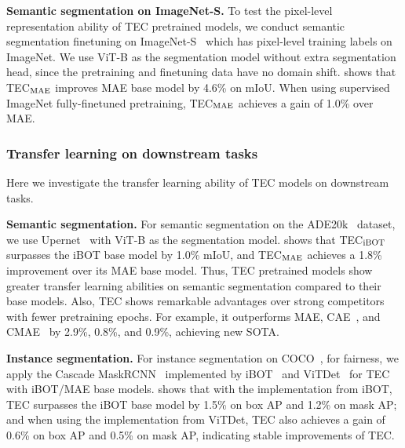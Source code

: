 \documentclass{article} \usepackage{iclr2023_conference,times}
\newcommand{\myPara}[1]{\vspace{-.05in} \noindent\textbf{#1}}
\begin{document}
\myPara{Semantic segmentation on ImageNet-S.} 
To test the pixel-level representation ability of TEC pretrained models, we conduct semantic segmentation finetuning on ImageNet-S~\citep{gao2021luss} which has  pixel-level training labels on ImageNet.
We use ViT-B as the segmentation model without   extra segmentation head, since the pretraining and finetuning data have no domain shift. 
  shows that 
 TEC$_{\rm MAE}$ improves   MAE base model by 4.6\% on  mIoU. When using  supervised ImageNet fully-finetuned pretraining, TEC$_{\rm MAE}$ achieves a gain of 1.0\% over MAE.

\vspace{-10pt}
\subsubsection{Transfer learning on downstream tasks}
\vspace{-10pt}
Here we investigate the transfer learning ability of TEC models on downstream tasks.

\myPara{Semantic segmentation.}
For semantic segmentation on the ADE20k~\citep{zhou2018semantic} dataset, we use Upernet~\citep{xiao2018unified} with  ViT-B as the segmentation model.
 shows that TEC$_{\rm iBOT}$ surpasses the iBOT base model by 1.0\%   mIoU, and
TEC$_{\rm MAE}$ achieves a 1.8\% improvement  over its MAE base model.
Thus, TEC pretrained models show greater transfer learning abilities on semantic segmentation compared to their base models.
Also, TEC shows remarkable advantages over strong competitors with fewer pretraining epochs. For example, it outperforms MAE, CAE~\citep{chen2022context}, and CMAE~\citep{huang2022contrastive} by 2.9\%, 0.8\%, and 0.9\%, achieving new SOTA.


\myPara{Instance segmentation.}
For instance segmentation on COCO~\citep{lin2014microsoft}, for fairness, we apply the Cascade MaskRCNN~\citep{cai2019cascade} implemented by iBOT~\citep{zhou2021ibot} and ViTDet~\citep{li2022exploring} for TEC with iBOT/MAE base models.
  shows that with the  implementation from iBOT, TEC surpasses the iBOT base model by 1.5\% on box AP and 1.2\% on mask AP; and when using the implementation from ViTDet, TEC also achieves a gain of 0.6\% on box AP and 0.5\% on mask AP, indicating stable improvements of TEC.
 \vspace{-10pt}
\end{document}
